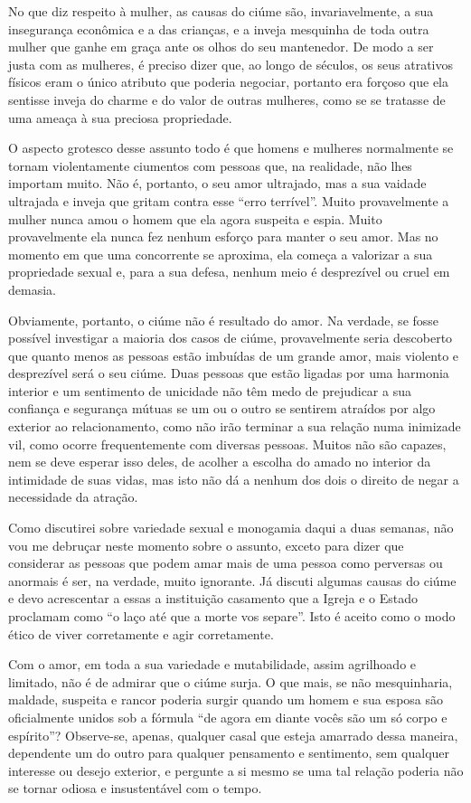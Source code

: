 No que diz respeito à mulher, as causas do ciúme são, invariavelmente, a
sua insegurança econômica e a das crianças, e a inveja mesquinha de toda
outra mulher que ganhe em graça ante os olhos do seu mantenedor. De modo a
ser justa com as mulheres, é preciso dizer que, ao longo de séculos, os seus
atrativos físicos eram o único atributo que poderia negociar, portanto era
forçoso que ela sentisse inveja do charme e do valor de outras mulheres,
como se se tratasse de uma ameaça à sua preciosa propriedade.

O aspecto grotesco desse assunto todo é que homens e mulheres
normalmente se tornam violentamente ciumentos com pessoas que, na
realidade, não lhes importam muito. Não é, portanto, o seu amor
ultrajado, mas a sua vaidade ultrajada e inveja que gritam contra esse
``erro terrível''. Muito provavelmente a mulher nunca amou o homem que
ela agora suspeita e espia. Muito provavelmente ela nunca fez nenhum
esforço para manter o seu amor. Mas no momento em que uma concorrente se
aproxima, ela começa a valorizar a sua propriedade sexual e, para a sua
defesa, nenhum meio é desprezível ou cruel em demasia.

Obviamente, portanto, o ciúme não é resultado do amor. Na verdade, se
fosse possível investigar a maioria dos casos de ciúme, provavelmente
seria descoberto que quanto menos as pessoas estão imbuídas de um grande
amor, mais violento e desprezível será o seu ciúme. Duas pessoas que
estão ligadas por uma harmonia interior e um sentimento de unicidade não
têm medo de prejudicar a sua confiança e segurança mútuas se um ou o
outro se sentirem atraídos por algo exterior ao relacionamento, como não
irão terminar a sua relação numa inimizade vil, como ocorre
frequentemente com diversas pessoas. Muitos não são capazes, nem se deve
esperar isso deles, de acolher a escolha do amado no interior da
intimidade de suas vidas, mas isto não dá a nenhum dos dois o direito de
negar a necessidade da atração.

Como discutirei sobre variedade sexual e monogamia daqui a duas semanas,
não vou me debruçar neste momento sobre o assunto, exceto para dizer que
considerar as pessoas que podem amar mais de uma pessoa como perversas
ou anormais é ser, na verdade, muito ignorante. Já discuti algumas
causas do ciúme e devo acrescentar a essas a instituição casamento que a
Igreja e o Estado proclamam como ``o laço até que a morte vos separe''.
Isto é aceito como o modo ético de viver corretamente e agir
corretamente.

Com o amor, em toda a sua variedade e mutabilidade, assim agrilhoado e
limitado, não é de admirar que o ciúme surja. O que mais, se não
mesquinharia, maldade, suspeita e rancor poderia surgir quando um homem e
sua esposa são oficialmente unidos sob a fórmula ``de agora em diante
vocês são um só corpo e espírito''? Observe-se, apenas, qualquer casal que
esteja amarrado dessa maneira, dependente um do outro para qualquer
pensamento e sentimento, sem qualquer interesse ou desejo exterior, e
pergunte a si mesmo se uma tal relação poderia não se tornar odiosa e
insustentável com o tempo.

